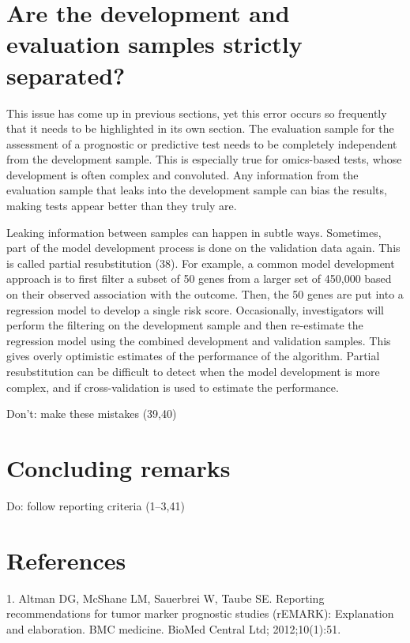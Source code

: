 \documentclass[11pt]{article}
\begin{document}
\section{Are the development and evaluation samples strictly
separated?}\label{are-the-development-and-evaluation-samples-strictly-separated}

This issue has come up in previous sections, yet this error occurs so
frequently that it needs to be highlighted in its own section. The
evaluation sample for the assessment of a prognostic or predictive test
needs to be completely independent from the development sample. This is
especially true for omics-based tests, whose development is often
complex and convoluted. Any information from the evaluation sample that
leaks into the development sample can bias the results, making tests
appear better than they truly are.

Leaking information between samples can happen in subtle ways.
Sometimes, part of the model development process is done on the
validation data again. This is called partial resubstitution (38). For
example, a common model development approach is to first filter a subset
of 50 genes from a larger set of 450,000 based on their observed
association with the outcome. Then, the 50 genes are put into a
regression model to develop a single risk score. Occasionally,
investigators will perform the filtering on the development sample and
then re-estimate the regression model using the combined development and
validation samples. This gives overly optimistic estimates of the
performance of the algorithm. Partial resubstitution can be difficult to
detect when the model development is more complex, and if
cross-validation is used to estimate the performance.

Don't: make these mistakes (39,40)

\section{Concluding remarks}\label{concluding-remarks}

Do: follow reporting criteria (1--3,41)

\section{References}\label{references}

\setlength{\parindent}{0pt}

1. Altman DG, McShane LM, Sauerbrei W, Taube SE. Reporting
recommendations for tumor marker prognostic studies (rEMARK):
Explanation and elaboration. BMC medicine. BioMed Central Ltd;
2012;10(1):51.
\end{document}
